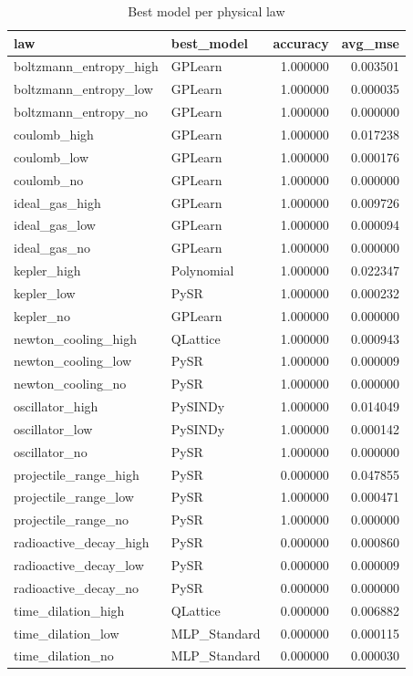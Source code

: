 \begin{table}
\caption{Best model per physical law}
\label{tab:best_models}
\begin{tabular}{llrr}
\toprule
law & best_model & accuracy & avg_mse \\
\midrule
boltzmann_entropy_high & GPLearn & 1.000000 & 0.003501 \\
boltzmann_entropy_low & GPLearn & 1.000000 & 0.000035 \\
boltzmann_entropy_no & GPLearn & 1.000000 & 0.000000 \\
coulomb_high & GPLearn & 1.000000 & 0.017238 \\
coulomb_low & GPLearn & 1.000000 & 0.000176 \\
coulomb_no & GPLearn & 1.000000 & 0.000000 \\
ideal_gas_high & GPLearn & 1.000000 & 0.009726 \\
ideal_gas_low & GPLearn & 1.000000 & 0.000094 \\
ideal_gas_no & GPLearn & 1.000000 & 0.000000 \\
kepler_high & Polynomial & 1.000000 & 0.022347 \\
kepler_low & PySR & 1.000000 & 0.000232 \\
kepler_no & GPLearn & 1.000000 & 0.000000 \\
newton_cooling_high & QLattice & 1.000000 & 0.000943 \\
newton_cooling_low & PySR & 1.000000 & 0.000009 \\
newton_cooling_no & PySR & 1.000000 & 0.000000 \\
oscillator_high & PySINDy & 1.000000 & 0.014049 \\
oscillator_low & PySINDy & 1.000000 & 0.000142 \\
oscillator_no & PySR & 1.000000 & 0.000000 \\
projectile_range_high & PySR & 0.000000 & 0.047855 \\
projectile_range_low & PySR & 1.000000 & 0.000471 \\
projectile_range_no & PySR & 1.000000 & 0.000000 \\
radioactive_decay_high & PySR & 0.000000 & 0.000860 \\
radioactive_decay_low & PySR & 0.000000 & 0.000009 \\
radioactive_decay_no & PySR & 0.000000 & 0.000000 \\
time_dilation_high & QLattice & 0.000000 & 0.006882 \\
time_dilation_low & MLP_Standard & 0.000000 & 0.000115 \\
time_dilation_no & MLP_Standard & 0.000000 & 0.000030 \\
\bottomrule
\end{tabular}
\end{table}
